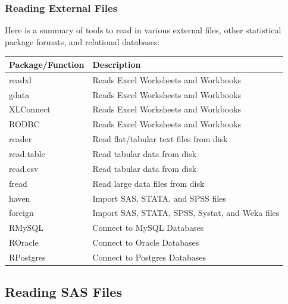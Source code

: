 \documentclass{beamer}
\begin{document}
\begin{frame}[fragile]
\frametitle{Reading External Files}
Here is a summary of tools to read in various external files, other statistical package formats, and relational databases:
\newline
\footnotesize

\begin{tabular}{| l | l |}
  \hline         
  \textbf{Package/Function} & \textbf{Description} \\ \hline
  readxl & Reads Excel Worksheets and Workbooks \\ \hline
  gdata  & Reads Excel Worksheets and Workbooks    \\ \hline
  XLConnect & Reads Excel Worksheets and Workbooks \\ \hline
   RODBC & Reads Excel Worksheets and Workbooks  \\ \hline
  reader & Read flat/tabular text files from disk \\ \hline
  read.table & Read tabular data from disk \\ \hline
  read.csv & Read tabular data from disk  \\ \hline
  fread & Read large data files from disk  \\ \hline
  haven & Import SAS, STATA, and SPSS files \\ \hline
  foreign & Import SAS, STATA, SPSS, Systat, and Weka files \\ \hline
  RMySQL & Connect to MySQL Databases \\ \hline
  ROracle & Connect to Oracle Databases \\ \hline
  RPostgres & Connect to Postgres Databases \\ \hline
  \hline  
\end{tabular}

\end{frame}

%
\subsection{Reading SAS Files}
\end{document}
